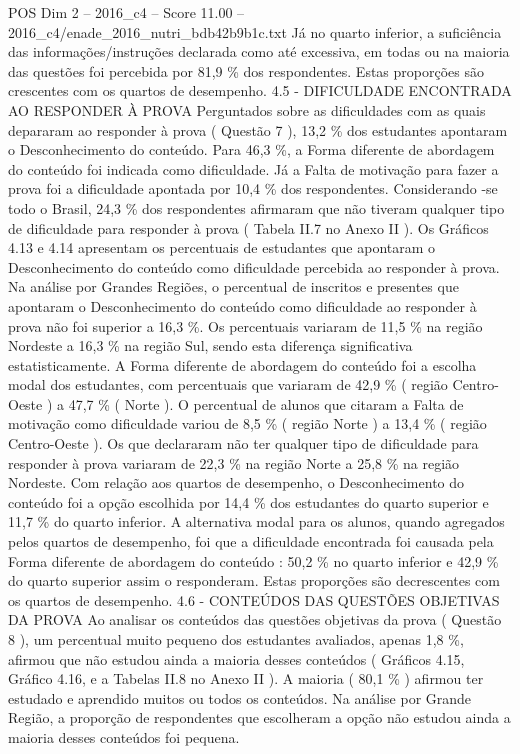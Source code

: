 \begin{textsample}{POS Dim 2 – 2016\_c4 – Score 11.00 – 2016\_c4/enade\_2016\_nutri\_bdb42b9b1c.txt}
Já no quarto inferior, a suficiência das informações/instruções declarada como até excessiva, em todas ou na maioria das questões foi percebida por 81,9 \% dos respondentes.
Estas proporções são crescentes com os quartos de desempenho. 4.5 - DIFICULDADE ENCONTRADA AO RESPONDER À PROVA Perguntados sobre as dificuldades com as quais depararam ao responder à prova ( Questão 7 ), 13,2 \% dos estudantes apontaram o Desconhecimento do conteúdo.
Para 46,3 \%, a Forma diferente de abordagem do conteúdo foi indicada como dificuldade.
Já a Falta de motivação para fazer a prova foi a dificuldade apontada por 10,4 \% dos respondentes.
Considerando -se todo o Brasil, 24,3 \% dos respondentes afirmaram que não tiveram qualquer tipo de dificuldade para responder à prova ( Tabela II.7 no Anexo II ).
Os Gráficos 4.13 e 4.14 apresentam os percentuais de estudantes que apontaram o Desconhecimento do conteúdo como dificuldade percebida ao responder à prova.
Na análise por Grandes Regiões, o percentual de inscritos e presentes que apontaram o Desconhecimento do conteúdo como dificuldade ao responder à prova não foi superior a 16,3 \%.
Os percentuais variaram de 11,5 \% na região Nordeste a 16,3 \% na região Sul, sendo esta diferença significativa estatisticamente.
A Forma diferente de abordagem do conteúdo foi a escolha modal dos estudantes, com percentuais que variaram de 42,9 \% ( região Centro-Oeste ) a 47,7 \% ( Norte ).
O percentual de alunos que citaram a Falta de motivação como dificuldade variou de 8,5 \% ( região Norte ) a 13,4 \% ( região Centro-Oeste ).
Os que declararam não ter qualquer tipo de dificuldade para responder à prova variaram de 22,3 \% na região Norte a 25,8 \% na região Nordeste.
Com relação aos quartos de desempenho, o Desconhecimento do conteúdo foi a opção escolhida por 14,4 \% dos estudantes do quarto superior e 11,7 \% do quarto inferior.
A alternativa modal para os alunos, quando agregados pelos quartos de desempenho, foi que a dificuldade encontrada foi causada pela Forma diferente de abordagem do conteúdo : 50,2 \% no quarto inferior e 42,9 \% do quarto superior assim o responderam.
Estas proporções são decrescentes com os quartos de desempenho. 4.6 - CONTEÚDOS DAS QUESTÕES OBJETIVAS DA PROVA Ao analisar os conteúdos das questões objetivas da prova ( Questão 8 ), um percentual muito pequeno dos estudantes avaliados, apenas 1,8 \%, afirmou que não estudou ainda a maioria desses conteúdos ( Gráficos 4.15, Gráfico 4.16, e a Tabelas II.8 no Anexo II ).
A maioria ( 80,1 \% ) afirmou ter estudado e aprendido muitos ou todos os conteúdos.
Na análise por Grande Região, a proporção de respondentes que escolheram a opção não estudou ainda a maioria desses conteúdos foi pequena.

\end{textsample}

